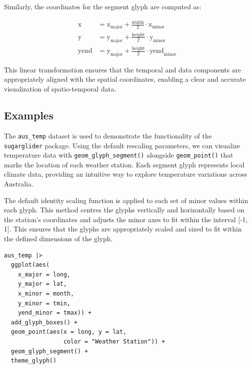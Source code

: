 Similarly, the coordinates for the segment glyph are computed as:

\begin{align}
\text{x} &= \text{x}_{\text{major}} + \frac{\text{width}}{2} \cdot \text{x}_{\text{minor}} \\
\text{y} &= \text{y}_{\text{major}} + \frac{\text{height}}{2} \cdot \text{y}_{\text{minor}} \\
\text{yend} &= \text{y}_{\text{major}} + \frac{\text{height}}{2} \cdot \text{yend}_{\text{minor}}
\end{align}

This linear transformation ensures that the temporal and data components are appropriately aligned with the spatial coordinates, enabling a clear and accurate visualization of spatio-temporal data.

\hypertarget{examples}{%
\subsection{Examples}\label{examples}}

The \texttt{aus\_temp} dataset is used to demonstrate the functionality of the \texttt{sugarglider} package. Using the default rescaling parameters, we can visualize temperature data with \texttt{geom\_glyph\_segment()} alongside \texttt{geom\_point()} that marks the location of each weather station. Each segment glyph represents local climate data, providing an intuitive way to explore temperature variations across Australia.

The default identity scaling function is applied to each set of minor values within each glyph. This method centres the glyphs vertically and horizontally based on the station's coordinates and adjusts the minor axes to fit within the interval {[}-1, 1{]}. This ensures that the glyphs are appropriately scaled and sized to fit within the defined dimensions of the glyph.

\begin{verbatim}
aus_temp |>
  ggplot(aes(
    x_major = long, 
    y_major = lat, 
    x_minor = month, 
    y_minor = tmin, 
    yend_minor = tmax)) +
  add_glyph_boxes() +
  geom_point(aes(x = long, y = lat,
                 color = "Weather Station")) +
  geom_glyph_segment() +
  theme_glyph()
\end{verbatim}

